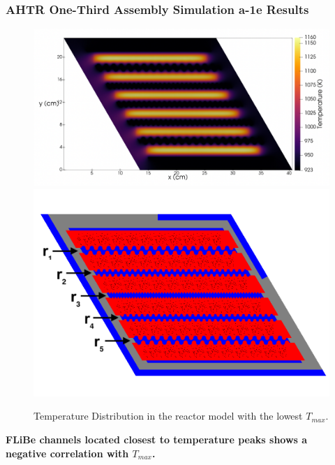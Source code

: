 \begin{frame}
    \frametitle{AHTR One-Third Assembly Simulation a-1e Results}
    \begin{figure}
        \includegraphics[width=0.55\linewidth]{../docs/figures/a-1e-temp-distribution-2d.png} 
        \includegraphics[width=0.4\linewidth]{../docs/figures/coolant-channel-shape-assem.png} 
        \caption{Temperature Distribution in the reactor model with the lowest $T_{max}$.}
    \end{figure}
    \begin{tcolorbox}[colback=illiniorange,colframe=illiniorange!50!black]
    \textbf{FLiBe channels located closest to temperature peaks shows a \\ negative 
    correlation with $T_{max}$.}
    \end{tcolorbox}
\end{frame}

